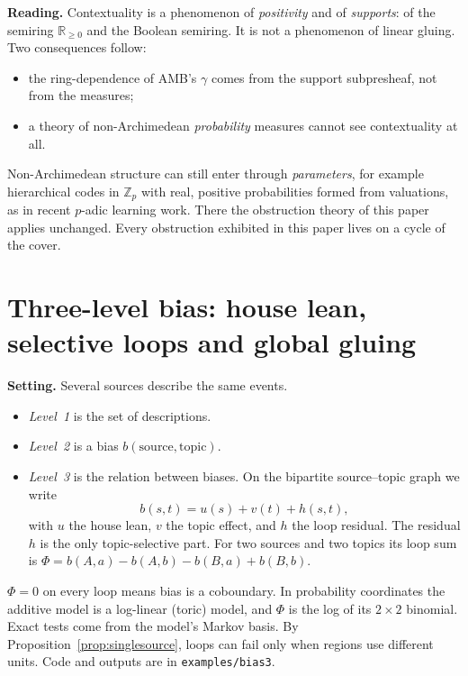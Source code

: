 \documentclass[11pt]{article}
\theoremstyle{definition}
\theoremstyle{remark}
\newcommand{\Z}{\mathbb{Z}}
\newcommand{\R}{\mathbb{R}}
\begin{document}
\noindent\textbf{Reading.} Contextuality is a phenomenon of \emph{positivity} and of \emph{supports}: of the semiring $\R_{\ge0}$ and the Boolean semiring. It is not a phenomenon of linear gluing. Two consequences follow:
\begin{itemize}
  \item the ring-dependence of AMB's $\gamma$ comes from the support subpresheaf, not from the measures;
  \item a theory of non-Archimedean \emph{probability} measures cannot see contextuality at all.
\end{itemize}
Non-Archimedean structure can still enter through \emph{parameters}, for example hierarchical codes in $\Z_p$ with real, positive probabilities formed from valuations, as in recent $p$-adic learning work. There the obstruction theory of this paper applies unchanged. Every obstruction exhibited in this paper lives on a cycle of the cover.

\section{Three-level bias: house lean, selective loops and global gluing}\label{sec:bias3}
\textbf{Setting.} Several sources describe the same events.
\begin{itemize}
  \item \emph{Level~1} is the set of descriptions.
  \item \emph{Level~2} is a bias $b(\text{source},\text{topic})$.
  \item \emph{Level~3} is the relation between biases. On the bipartite source--topic graph we write
  \[
  b(s,t)=u(s)+v(t)+h(s,t),
  \]
  with $u$ the house lean, $v$ the topic effect, and $h$ the loop residual. The residual $h$ is the only topic-selective part. For two sources and two topics its loop sum is $\Phi=b(A,a)-b(A,b)-b(B,a)+b(B,b)$.
\end{itemize}
$\Phi=0$ on every loop means bias is a coboundary. In probability coordinates the additive model is a log-linear (toric) model, and $\Phi$ is the log of its $2\times2$ binomial. Exact tests come from the model's Markov basis. By Proposition~\ref{prop:singlesource}, loops can fail only when regions use different units. Code and outputs are in \texttt{examples/bias3}.
\end{document}
